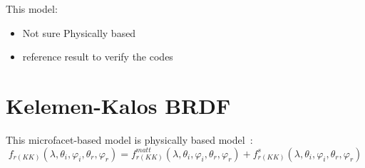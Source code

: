 This model:
\begin{itemize}
    \item Not sure Physically based
    \item reference result to verify the codes
\end{itemize}


\section{Kelemen-Kalos BRDF}
This microfacet-based model is physically based model~\cite{2001_Kelemen}:
\begin{equation}
    \label{eq_Kelemen_Kalos}
    f_{r(KK)}(\lambda, \theta_i, \varphi_i, \theta_r, \varphi_r) = f_{r(KK)}^{matt}(\lambda, \theta_i, \varphi_i, \theta_r, \varphi_r) + f_{r(KK)}^{s}(\lambda, \theta_i, \varphi_i, \theta_r, \varphi_r)
\end{equation}

